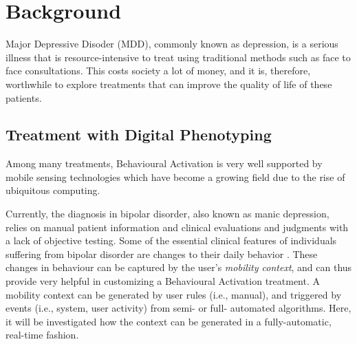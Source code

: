 \section{Background}


Major Depressive Disoder (MDD), commonly known as depression, is a serious illness that is resource-intensive to treat using traditional methods such as face to face consultations. This costs society a lot of money, and it is, therefore, worthwhile to explore treatments that can improve the quality of life of these patients. 

\subsection*{Treatment with Digital Phenotyping}
Among many treatments, Behavioural Activation is very well supported by mobile sensing technologies which have become a growing field due to the rise of ubiquitous computing. 

Currently, the diagnosis in bipolar disorder, also known as manic depression, relies on manual patient information and clinical evaluations and judgments with a lack of objective testing. Some of the essential clinical features of individuals suffering from bipolar disorder are changes to their daily behavior \cite{objective_smartphone_data_as_diagnostic_marker}. These changes in behaviour can be captured by the user's \textit{mobility context}, and can thus provide very helpful in customizing a Behavioural Activation treatment. A mobility context can be generated by user rules (i.e., manual), and triggered by events (i.e., system, user activity) from semi- or full- automated algorithms. Here, it will be investigated how the context can be generated in a fully-automatic, real-time fashion.

